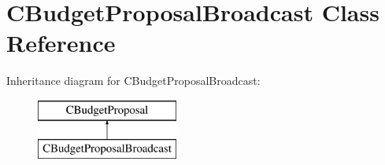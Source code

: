 \hypertarget{class_c_budget_proposal_broadcast}{}\section{C\+Budget\+Proposal\+Broadcast Class Reference}
\label{class_c_budget_proposal_broadcast}
Inheritance diagram for C\+Budget\+Proposal\+Broadcast\+:\begin{figure}[H]
\begin{center}
\leavevmode
\includegraphics[height=2.000000cm]{class_c_budget_proposal_broadcast}
\end{center}
\end{figure}
